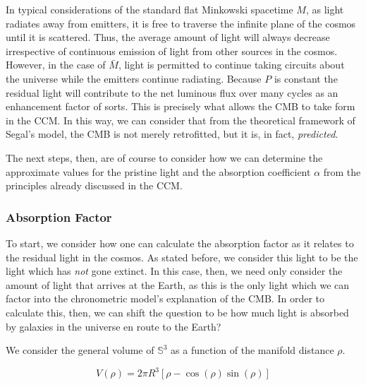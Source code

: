 \documentclass[a4paper]{article}
\begin{document}

    In typical considerations of the standard flat Minkowski spacetime $M$, as
    light radiates away from emitters, it is free to traverse the infinite
    plane of the cosmos until it is scattered. Thus, the average amount of
    light will always decrease irrespective of continuous emission of light
    from other sources in the cosmos. However, in the case of $\bar{M}$, light
    is permitted to continue taking circuits about the universe while the
    emitters continue radiating. Because $P$ is constant the residual light
    will contribute to the net luminous flux over many cycles as an enhancement
    factor of sorts. This is precisely what allows the CMB to take form in the
    CCM. In this way, we can consider that from the theoretical framework of
    Segal's model, the CMB is not merely retrofitted, but it is, in fact,
    \textit{predicted}.

    The next steps, then, are of course to consider how we can determine the
    approximate values for the pristine light and the absorption coefficient
    $\alpha$ from the principles already discussed in the CCM.

    \subsubsection{Absorption Factor}

    To start, we consider how one can calculate the absorption factor as it
    relates to the residual light in the cosmos. As stated before, we consider
    this light to be the light which has \textit{not} gone extinct. In this
    case, then, we need only consider the amount of light that arrives at the
    Earth, as this is the only light which we can factor into the chronometric
    model's explanation of the CMB. In order to calculate this, then, we can
    shift the question to be how much light is absorbed by galaxies in the
    universe en route to the Earth?

    We consider the general volume of $\mathbb{S}^3$  as a
    function of the manifold distance $\rho$.

    \begin{equation*}
        V(\rho) = 2 \pi R^3 \left[\rho-\cos(\rho)\sin(\rho)\right]
    \end{equation*}

\end{document}
